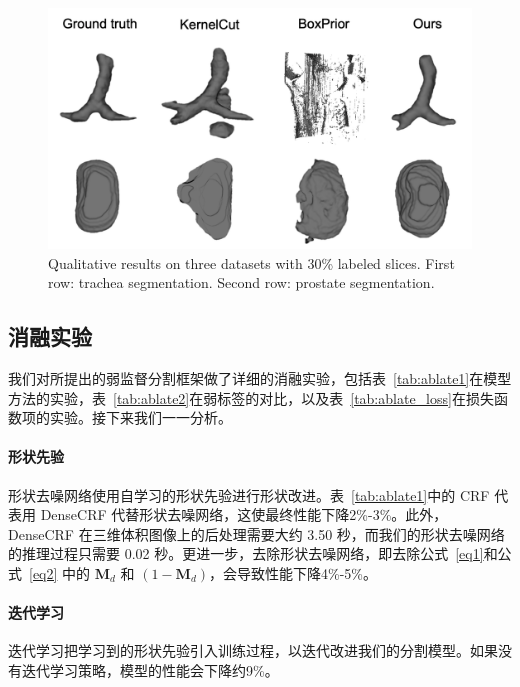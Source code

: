     \begin{figure}[tbp]
        \centering 
        \includegraphics[width=1.0\textwidth]{img/c3/final_vis4.png}
        {Qualitative results on three datasets with 30\% labeled slices. First row: trachea segmentation. Second row: prostate segmentation.}
        \label{fig:vis}
    \end{figure}


\subsection{消融实验} \label{sec:ablate}

我们对所提出的弱监督分割框架做了详细的消融实验，包括表~\ref{tab:ablate1}在模型方法的实验，表~\ref{tab:ablate2}在弱标签的对比，以及表~\ref{tab:ablate_loss}在损失函数项的实验。接下来我们一一分析。

\paragraph{形状先验}
形状去噪网络使用自学习的形状先验进行形状改进。表~\ref{tab:ablate1}中的 CRF 代表用 DenseCRF 代替形状去噪网络，这使最终性能下降2\%-3\%。此外，DenseCRF 在三维体积图像上的后处理需要大约 3.50 秒，而我们的形状去噪网络的推理过程只需要 0.02 秒。更进一步，去除形状去噪网络，即去除公式~\ref{eq1}和公式~\ref{eq2} 中的 $\mathbf{M}_d$ 和 $(1-\mathbf{M}_d)$，会导致性能下降4\%-5\%。
\paragraph{迭代学习}
迭代学习把学习到的形状先验引入训练过程，以迭代改进我们的分割模型。如果没有迭代学习策略，模型的性能会下降约9\%。
